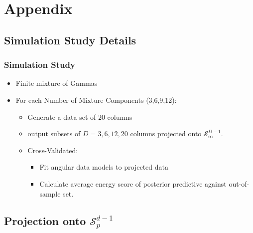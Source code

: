 \documentclass[aspectratio=169,10pt]{beamer}
\begin{document}
\section*{Appendix}

\subsection*{Simulation Study Details}

\begin{frame}
    \label{pgpareto:simstudydetails}
    \frametitle{Simulation Study}
    \begin{itemize}
        \item Finite mixture of Gammas
        \item For each Number of Mixture Components (3,6,9,12):
            \begin{itemize}
                \item Generate a data-set of 20 columns
                \item output subsets of $D = 3,6,12,20$ columns projected 
                    onto $\mathcal{S}_{\infty}^{D-1}$.
                \item Cross-Validated:
                    \begin{itemize}
                        \item Fit angular data models to projected data
                        \item Calculate average energy score of posterior 
                            predictive against out-of-sample set.
                    \end{itemize}
            \end{itemize}
    \end{itemize}
    \hyperlink{pgpareto:simstudy}{}
\end{frame} %

\subsection*{Projection onto $\mathcal{S}_p^{d-1}$}
\end{document}
